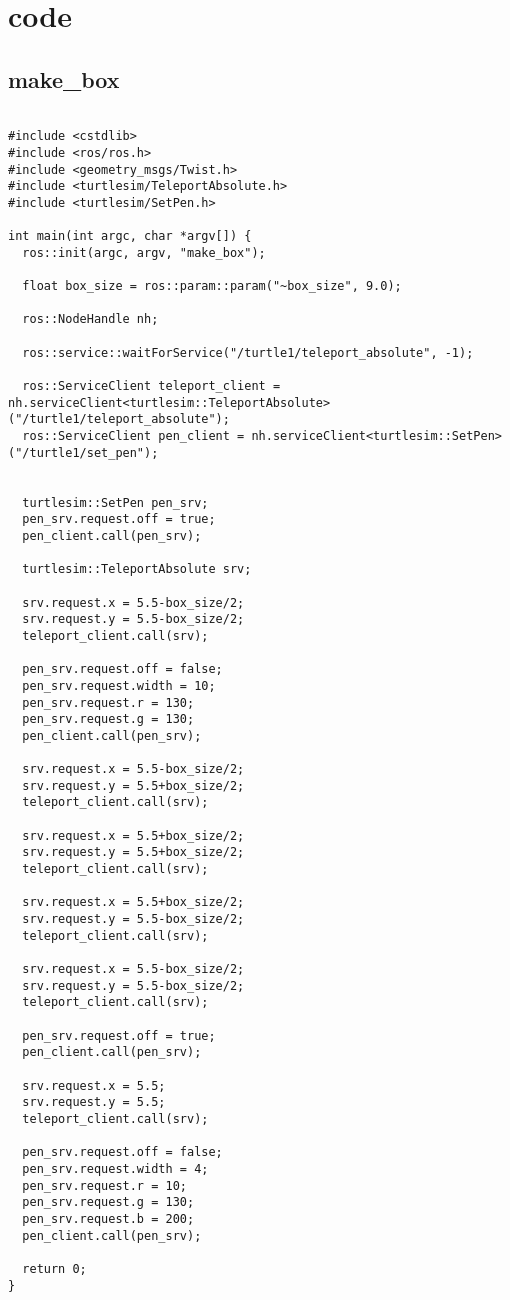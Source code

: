 \chapter{code}

\section{make\_box}

\begin{lstlisting}

#include <cstdlib>
#include <ros/ros.h>
#include <geometry_msgs/Twist.h>
#include <turtlesim/TeleportAbsolute.h>
#include <turtlesim/SetPen.h>

int main(int argc, char *argv[]) {
  ros::init(argc, argv, "make_box");

  float box_size = ros::param::param("~box_size", 9.0);

  ros::NodeHandle nh;

  ros::service::waitForService("/turtle1/teleport_absolute", -1);

  ros::ServiceClient teleport_client = nh.serviceClient<turtlesim::TeleportAbsolute>("/turtle1/teleport_absolute");
  ros::ServiceClient pen_client = nh.serviceClient<turtlesim::SetPen>("/turtle1/set_pen");


  turtlesim::SetPen pen_srv;
  pen_srv.request.off = true;
  pen_client.call(pen_srv);

  turtlesim::TeleportAbsolute srv;

  srv.request.x = 5.5-box_size/2;
  srv.request.y = 5.5-box_size/2;
  teleport_client.call(srv);

  pen_srv.request.off = false;
  pen_srv.request.width = 10;
  pen_srv.request.r = 130;
  pen_srv.request.g = 130;
  pen_client.call(pen_srv);

  srv.request.x = 5.5-box_size/2;
  srv.request.y = 5.5+box_size/2;
  teleport_client.call(srv);

  srv.request.x = 5.5+box_size/2;
  srv.request.y = 5.5+box_size/2;
  teleport_client.call(srv);

  srv.request.x = 5.5+box_size/2;
  srv.request.y = 5.5-box_size/2;
  teleport_client.call(srv);

  srv.request.x = 5.5-box_size/2;
  srv.request.y = 5.5-box_size/2;
  teleport_client.call(srv);

  pen_srv.request.off = true;
  pen_client.call(pen_srv);

  srv.request.x = 5.5;
  srv.request.y = 5.5;
  teleport_client.call(srv);

  pen_srv.request.off = false;
  pen_srv.request.width = 4;
  pen_srv.request.r = 10;
  pen_srv.request.g = 130;
  pen_srv.request.b = 200;
  pen_client.call(pen_srv);

  return 0;
}
\end{lstlisting}
